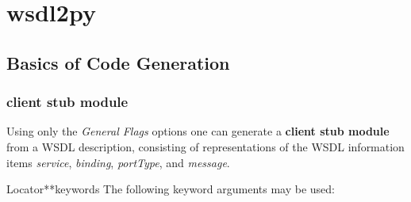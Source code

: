 \section{wsdl2py}

\subsection{Basics of Code Generation}
\label{subsection:Basics of Code Generation}

\subsubsection{client stub module}
Using only the {\it General Flags} options one can generate a 
{\bfseries client stub module} from a WSDL description, consisting of
representations of the WSDL information items {\it service}, {\it binding}, 
{\it portType}, and {\it message}.

 
\begin{classdesc}{Locator}{**keywords}
The following keyword arguments may be used:
% 
% 
% 
% 
% 

\end{classdesc}



